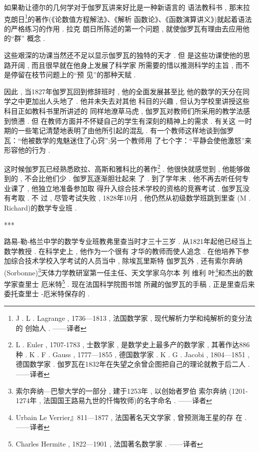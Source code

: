 如果勒让德尔的几何学对于伽罗瓦讲来好比是一种新语言的 语法教科书 , 那末拉克朗日\footnote{J . L . Lagrange , 1736—1813 , 法国数学家 , 现代解析力学和纯解析的变分法的 创始人 . ——译者}的著作(《论数值方程解法》、《解析 函数论》、《函数演算讲义》)就起着语法的严格练习的作用 . 拉克 朗日所陈述的第一个问题 , 就使伽罗瓦有理由去应用他的“群” 概念 . 

这些艰深的功课当然还不足以显示伽罗瓦的独特的天才 . 但 是这些功课使他的思路开阔 , 而且很早就在他身上发展了科学家 所需要的惜以推测科学的主旨 , 而不是停留在枝节问题上的“预 见”的那种天赋 . 

因此 , 当1827年伽罗瓦回到修辞班时 , 他的全面发展甚至比 他的数学的天分在同学之中更加出人头地了 . 他并未失去对其他 科目的兴趣 , 但认为学校里讲授这些科目正如教科书里所讲述的 同样地潦草马虎 , 伽罗瓦对教师们所采用的教学法感到愤懑 . 但 在教师方面并不怀疑自己的学生有深刻的精神上的需求 . 有关这 一时期的一些笔记清楚地表明了由他所引起的混乱 . 有一个教师这样地谈到伽罗瓦：“他被数学的鬼魅迷住了心窍”;另一个教师用 了七个字：“平静会使他激怒”来形容他的行为 . 



这时候伽罗瓦已经熟悉欧拉、高斯和雅科比的著作\footnote{L . Euler , 1707-1783 , 士数学家 , 是数学史上最多产的数学家 , 其著作达886 种 . K . F . Gauss , 1777—1855 ,  德国数学家 .  K . G . Jacobi ,  1804—1851 , 德国数学家 .  伽罗瓦在1832年在失望之余曾企图把自己的理论就教于后二人 . ——译者} . 他很快就感觉到 , 他能够做到的 , 不会比他们少 . 伽罗瓦逐渐胆壮起来 了 . 到了学年末 , 他不再去听任何专业课了 , 他独立地准备参加取 得升入综合技术学校的资格的竞赛考试 . 伽罗瓦没有考取 . 不 过 , 尽管考试失败 , 1828年10月 , 他仍然从初级数学班跳到里查 (M . Richard)的数学专业班 . 

\begin{center}***
\end{center}

路易-勒-格兰中学的数学专业班教弗里查当时才三十三岁 .  从1821年起他已经当上数学教授 . 在科学史上 , 他作为一个很有 才华的教师而使人追念 . 在他培养下参加综合技术学校入学考试的人员当中 , 除埃瓦里斯特 \textbullet 伽罗瓦外 , 还有索尔奔纳(Sorbonne)\footnote{索尔奔纳—巴黎大学的一部分 , 建于1253年 , 以创始者罗伯 \textbullet 索尔奔纳 (1201-1274年 , 法国国王路易九世的忏悔牧师)的名字命名 . ——译者}天体力学教研室第一任主任、天文学家乌尔本 \textbullet 列 \textbullet 维利 叶\footnote{Urbain Le Verrier』811—1877 , 法国著名天文学家 , 曾预测海王星的存 在 . ——译者}和杰出的数学家查里士  \textbullet 厄米特\footnote{Charles Hermite ,  1822—1901 , 法国著名数学家 . ——译者} . 现在法国科学院图书馆 所藏的伽罗瓦的手稿 , 正是里查后来委托查里士 -厄米特保存的 . 

